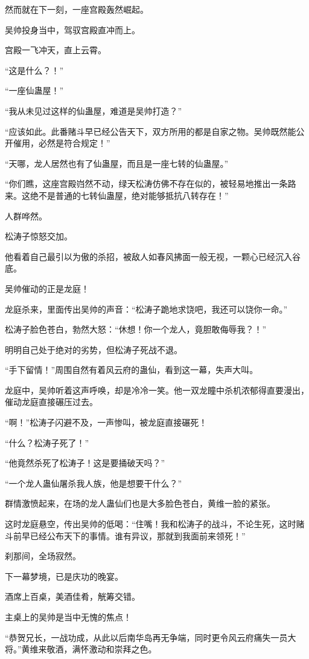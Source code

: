 \begin{this_body}
然而就在下一刻，一座宫殿轰然崛起。

吴帅投身当中，驾驭宫殿直冲而上。

宫殿一飞冲天，直上云霄。

“这是什么？！”

“一座仙蛊屋！”

“我从未见过这样的仙蛊屋，难道是吴帅打造？”

“应该如此。此番赌斗早已经公告天下，双方所用的都是自家之物。吴帅既然能公开催用，必然是符合规定！”

“天哪，龙人居然也有了仙蛊屋，而且是一座七转的仙蛊屋。”

“你们瞧，这座宫殿岿然不动，绿天松涛仿佛不存在似的，被轻易地推出一条路来。这绝不是普通的七转仙蛊屋，绝对能够抵抗八转存在！”

人群哗然。

松涛子惊怒交加。

他看着自己最引以为傲的杀招，被敌人如春风拂面一般无视，一颗心已经沉入谷底。

吴帅催动的正是龙庭！

龙庭杀来，里面传出吴帅的声音：“松涛子跪地求饶吧，我还可以饶你一命。”

松涛子脸色苍白，勃然大怒：“休想！你一个龙人，竟胆敢侮辱我？！”

明明自己处于绝对的劣势，但松涛子死战不退。

“手下留情！”周围自然有着风云府的蛊仙，看到这一幕，失声大叫。

龙庭中，吴帅听着这声呼唤，却是冷冷一笑。他一双龙瞳中杀机浓郁得直要漫出，催动龙庭直接碾压过去。

“啊！”松涛子闪避不及，一声惨叫，被龙庭直接碾死！

“什么？松涛子死了！”

“他竟然杀死了松涛子！这是要捅破天吗？”

“一个龙人蛊仙屠杀我人族，他是想要干什么？”

群情激愤起来，在场的龙人蛊仙们也是大多脸色苍白，黄维一脸的紧张。

这时龙庭悬空，传出吴帅的低喝：“住嘴！我和松涛子的战斗，不论生死，这时赌斗前早已经公布天下的事情。谁有异议，那就到我面前来领死！”

刹那间，全场寂然。

下一幕梦境，已是庆功的晚宴。

酒席上百桌，美酒佳肴，觥筹交错。

主桌上的吴帅是当中无愧的焦点！

“恭贺兄长，一战功成，从此以后南华岛再无争端，同时更令风云府痛失一员大将。”黄维来敬酒，满怀激动和崇拜之色。


\end{this_body}
